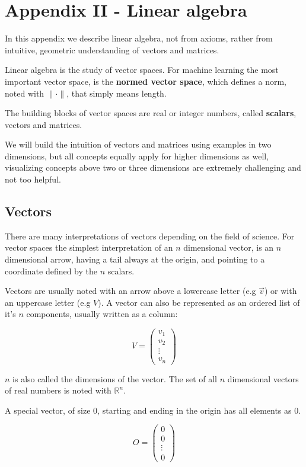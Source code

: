 \chapter{Appendix II - Linear algebra}

In this appendix we describe linear algebra, not from axioms, rather from intuitive, geometric understanding of vectors and matrices.

Linear algebra is the study of vector spaces. For machine learning the most important vector space, is the \textbf{normed vector space}, which defines a norm, noted with \(\|\cdot\|\), that simply means length.

The building blocks of vector spaces are real or integer numbers, called \textbf{scalars}, vectors and matrices.

We will build the intuition of vectors and matrices using examples in two dimensions, but all concepts equally apply for higher dimensions as well, visualizing concepts above two or three dimensions are extremely challenging and not too helpful.

\section{Vectors}

There are many interpretations of vectors depending on the field of science. For vector spaces the simplest interpretation of an \(n\) dimensional vector, is an \(n\) dimensional arrow, having a tail always at the origin, and pointing to a coordinate defined by the \(n\) scalars.

Vectors are usually noted with an arrow above a lowercase letter (e.g \(\vec{v}\)) or with an uppercase letter (e.g \(V\)). A vector can also be represented as an ordered list of it's \(n\) components, usually written as a column:

\[V = \begin{pmatrix} v_1 \\ v_2 \\ \vdots \\ v_n \end{pmatrix}\]

\(n\) is also called the dimensions of the vector. The set of all \(n\) dimensional vectors of real numbers is noted with \(\mathbb{R}^n\).

A special vector, of size \(0\), starting and ending in the origin has all elements as \(0\).

\[O = \begin{pmatrix} 0 \\ 0 \\ \vdots \\ 0 \end{pmatrix}\]

